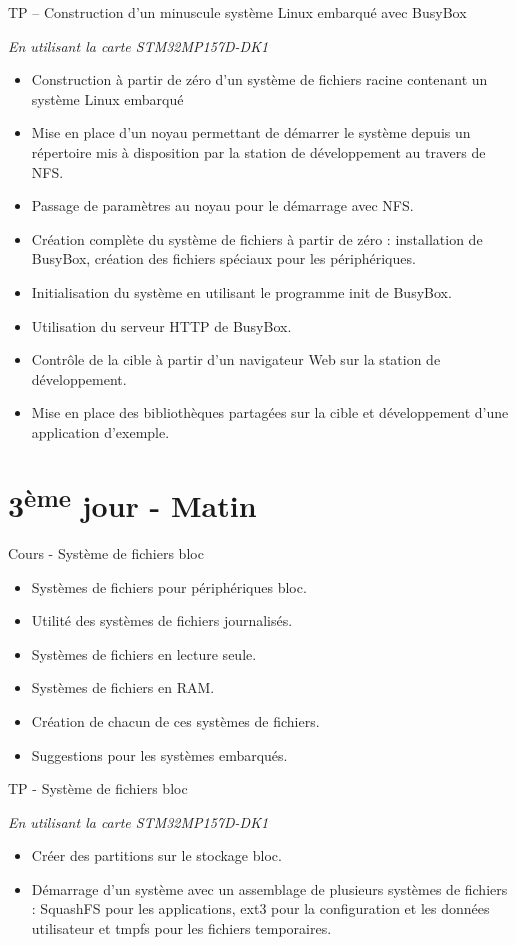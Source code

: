 \documentclass[a4paper,12pt,obeyspaces,spaces,hyphens]{article}
\begin{document}
\feagendaonecolumn
{TP – Construction d'un minuscule système Linux embarqué avec BusyBox}
{
  {\em En utilisant la carte STM32MP157D-DK1}
  \begin{itemize}
  \item Construction à partir de zéro d'un système de fichiers racine
	contenant un système Linux embarqué
  \item Mise en place d'un noyau permettant de démarrer le système
	depuis un répertoire mis à disposition par la station de
	développement au travers de NFS.
  \item Passage de paramètres au noyau pour le démarrage avec NFS.
  \item Création complète du système de fichiers à partir de zéro :
	installation de BusyBox, création des fichiers spéciaux
	pour les périphériques.
  \item Initialisation du système en utilisant le programme init de BusyBox.
  \item Utilisation du serveur HTTP de BusyBox.
  \item Contrôle de la cible à partir d'un navigateur Web sur la
	station de développement.
  \item Mise en place des bibliothèques partagées sur la cible et
	développement d'une application d'exemple.
  \end{itemize}
}

\section{3\textsuperscript{ème} jour - Matin}

\feagendatwocolumn
{Cours - Système de fichiers bloc}
{
  \begin{itemize}
  \item Systèmes de fichiers pour périphériques bloc.
  \item Utilité des systèmes de fichiers journalisés.
  \item Systèmes de fichiers en lecture seule.
  \item Systèmes de fichiers en RAM.
  \item Création de chacun de ces systèmes de fichiers.
  \item Suggestions pour les systèmes embarqués.
  \end{itemize}
}
{TP - Système de fichiers bloc}
{
  {\em En utilisant la carte STM32MP157D-DK1}
  \begin{itemize}
  \item Créer des partitions sur le stockage bloc.
  \item Démarrage d'un système avec un assemblage de plusieurs systèmes
	de fichiers : SquashFS pour les applications, ext3 pour la
 	configuration et les données utilisateur et tmpfs pour les
	fichiers temporaires.
  \end{itemize}
}
\end{document}
